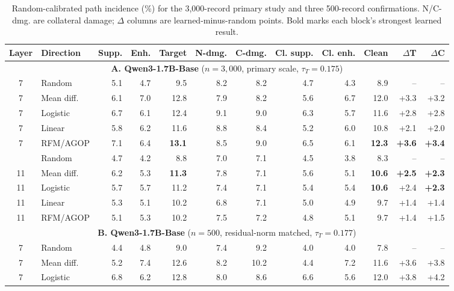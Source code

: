 \begin{table}[!t]
\centering
\small
\renewcommand{\arraystretch}{0.88}
\setlength{\tabcolsep}{1.4pt}
\caption{Random-calibrated path incidence (\%) for the 3,000-record primary study and three 500-record confirmations. N/C-dmg. are collateral damage; $\Delta$ columns are learned-minus-random points. Bold marks each block's strongest learned result.}
\label{tab:main-results}
\begin{tabular*}{\textwidth}{@{\extracolsep{\fill}}clrrrrrrrrrr@{}}
\toprule
Layer & Direction & Supp. & Enh. & Target & N-dmg. & C-dmg. & Cl. supp. & Cl. enh. & Clean & $\Delta$T & $\Delta$C \\
\midrule
\multicolumn{12}{c}{\textbf{A. Qwen3-1.7B-Base} \quad ($n=3,000$, primary scale, $\tau_T=0.175$)} \\
\cmidrule(lr){1-12}
7 & Random & 5.1 & 4.7 & 9.5 & 8.2 & 8.2 & 4.7 & 4.3 & 8.9 & -- & -- \\
7 & Mean diff. & 6.1 & 7.0 & 12.8 & 7.9 & 8.2 & 5.6 & 6.7 & 12.0 & +3.3 & +3.2 \\
7 & Logistic & 6.7 & 6.1 & 12.4 & 9.1 & 9.0 & 6.3 & 5.7 & 11.6 & +2.8 & +2.8 \\
7 & Linear & 5.8 & 6.2 & 11.6 & 8.8 & 8.4 & 5.2 & 6.0 & 10.8 & +2.1 & +2.0 \\
7 & RFM/AGOP & 7.1 & 6.4 & \textbf{13.1} & 8.5 & 9.0 & 6.5 & 6.1 & \textbf{12.3} & \textbf{+3.6} & \textbf{+3.4} \\
\addlinespace[0.35pt]
11 & Random & 4.7 & 4.2 & 8.8 & 7.0 & 7.1 & 4.5 & 3.8 & 8.3 & -- & -- \\
11 & Mean diff. & 6.2 & 5.3 & \textbf{11.3} & 7.8 & 7.1 & 5.6 & 5.1 & \textbf{10.6} & \textbf{+2.5} & \textbf{+2.3} \\
11 & Logistic & 5.7 & 5.7 & 11.2 & 7.4 & 7.1 & 5.4 & 5.4 & \textbf{10.6} & +2.4 & \textbf{+2.3} \\
11 & Linear & 5.3 & 5.1 & 10.2 & 6.8 & 7.1 & 5.0 & 4.9 & 9.7 & +1.4 & +1.4 \\
11 & RFM/AGOP & 5.1 & 5.3 & 10.2 & 7.5 & 7.2 & 4.8 & 5.1 & 9.7 & +1.4 & +1.5 \\
\midrule
\multicolumn{12}{c}{\textbf{B. Qwen3-1.7B-Base} \quad ($n=500$, residual-norm matched, $\tau_T=0.177$)} \\
\cmidrule(lr){1-12}
7 & Random & 4.4 & 4.8 & 9.0 & 7.4 & 9.2 & 4.0 & 4.0 & 7.8 & -- & -- \\
7 & Mean diff. & 5.2 & 7.4 & 12.6 & 8.2 & 10.2 & 4.4 & 7.2 & 11.6 & +3.6 & +3.8 \\
7 & Logistic & 6.8 & 6.2 & 12.8 & 8.0 & 8.6 & 6.6 & 5.6 & 12.0 & +3.8 & +4.2 \\

\end{tabular*}
\end{table}
